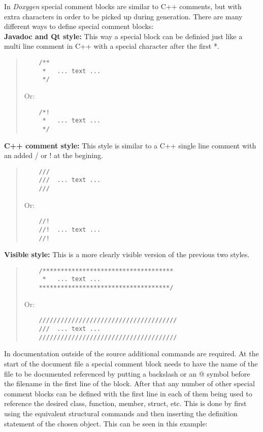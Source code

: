 In \textit{Doxygen} special comment blocks are similar to C++ comments, but with extra characters in order to be picked up during generation. There are many different 
ways to define special comment blocks:\\
\vspace{\baselineskip}
\textbf{Javadoc and Qt style:} This way a special block can be definied just like a multi line comment in C++ with a special character after the first *.
\begin{quote}
\begin{verbatim}
    /**
     *   ... text ...
     */
\end{verbatim}
Or:
\begin{verbatim}
    /*!
     *   ... text ...
     */
\end{verbatim}
\end{quote}      
\vspace{\baselineskip}
\textbf{C++ comment style:} This style is similar to a C++ single line comment with an added / or ! at the begining.
\begin{quote}
\begin{verbatim}  
    ///
    ///  ... text ...
    ///
\end{verbatim}
Or:
\begin{verbatim}
    //!
    //!  ... text ...
    //!
\end{verbatim}
\end{quote}
\vspace{\baselineskip}
\textbf{Visible style:} This is a more clearly visible version of the previous two styles.
\begin{quote}
\begin{verbatim}
    /************************************
     *   ... text ...
    ************************************/
\end{verbatim}
Or:
\begin{verbatim}
    //////////////////////////////////////
    ///  ... text ...
    //////////////////////////////////////
\end{verbatim}
\end{quote}
\vspace{\baselineskip}

In documentation outside of the source additional commands are required. At the start of the document file a special comment block needs to have the name of the
file to be documented referenced by putting a backslash or an @ symbol before the filename in the first line of the block. After that any number of other 
special comment blocks can be defined with the first line in each of them being used to reference the desired class, function, member, struct, etc. This is done by
first using the equivalent structural commands and then inserting the definition statement of the chosen object. This can be seen in this example:\\

